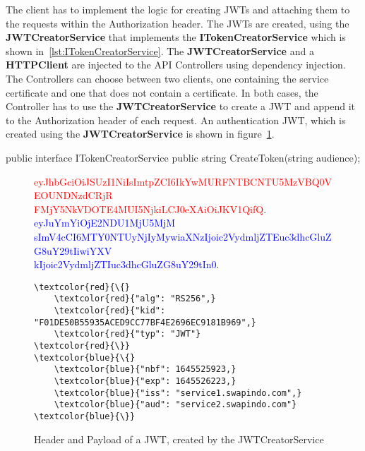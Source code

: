 The client has to implement the logic for creating JWTs and attaching them to the requests within the Authorization header.
The JWTs are created, using the \textbf{JWTCreatorService} that implements the \textbf{ITokenCreatorService} which is shown in~\ref{lst:ITokenCreatorService}.
The \textbf{JWTCreatorService} and a \textbf{HTTPClient} are injected to the API Controllers using dependency injection.
The Controllers can choose between two clients, one containing the service certificate and one that does not contain a certificate.
In both cases, the Controller has to use the \textbf{JWTCreatorService} to create a JWT and append it to the Authorization header of each request.
An authentication JWT, which is created using the \textbf{JWTCreatorService} is shown in figure~\ref{fig:jwt_en_decoded}.

\noindent \begin{minipage}{\linewidth}
	\begin{CsCode}[label={lst:ITokenCreatorService}, caption={ITokenCreatorService interface, which is injected to the API Controllers},captionpos=b]
		public interface ITokenCreatorService {
			public string CreateToken(string audience);
		}
	\end{CsCode}
\end{minipage}

\begin{figure}
	\begin{centering}
	\end{centering}
	\textcolor{red}{eyJhbGciOiJSUzI1NiIsImtpZCI6IkYwMURFNTBCNTU5MzVBQ0VEOUNDNzdCRjR\\FMjY5NkVDOTE4MUI5NjkiLCJ0eXAiOiJKV1QifQ}.
	\textcolor{blue}{eyJuYmYiOjE2NDU1MjU5MjM\\sImV4cCI6MTY0NTUyNjIyMywiaXNzIjoic2VydmljZTEuc3dhcGluZG8uY29tIiwiYXV\\kIjoic2VydmljZTIuc3dhcGluZG8uY29tIn0}.
	\\ 
	\begin{Verbatim}[commandchars=\\\{\}]
\textcolor{red}{\{} 
	\textcolor{red}{"alg": "RS256",}
	\textcolor{red}{"kid": "F01DE50B55935ACED9CC77BF4E2696EC9181B969",}
	\textcolor{red}{"typ": "JWT"} 
\textcolor{red}{\}}
\textcolor{blue}{\{} 
	\textcolor{blue}{"nbf": 1645525923,}
	\textcolor{blue}{"exp": 1645526223,}
	\textcolor{blue}{"iss": "service1.swapindo.com",}
	\textcolor{blue}{"aud": "service2.swapindo.com"} 
\textcolor{blue}{\}}
	\end{Verbatim}
	\caption{Header and Payload of a JWT, created by the JWTCreatorService}
	\label{fig:jwt_en_decoded}
\end{figure}

